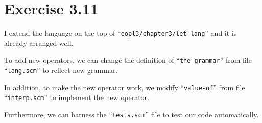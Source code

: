 \section*{Exercise 3.11}

I extend the language on the top of ``\texttt{eopl3/chapter3/let-lang}'' and
it is already arranged well.

To add new operators, we can change the definition of ``\texttt{the-grammar}''
from file ``\texttt{lang.scm}'' to reflect new grammar.

In addition, to make the new operator work, we modify ``\texttt{value-of}''
from file ``\texttt{interp.scm}'' to implement the new operator.

Furthermore, we can harness the ``\texttt{tests.scm}'' file to test our code
automatically.
